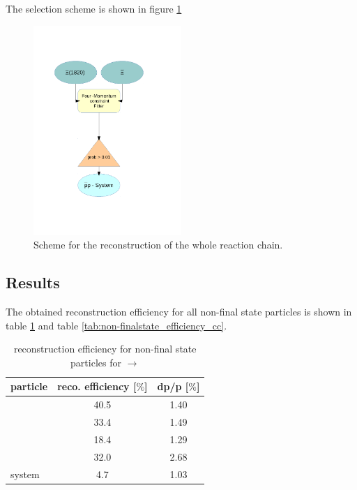 	The selection scheme is shown in figure \ref{fig:fourconstraintfit}
	 
	\begin{figure}
		\centering
			\includegraphics[width=0.50\textwidth]{./plots/combineCascadeSys.pdf}
		\caption{\propose Scheme for the reconstruction of the whole reaction chain.}
		\label{fig:fourconstraintfit}
	\end{figure}
	
	\subsection*{Results}
	
	The obtained reconstruction efficiency for all non-final state particles is shown in table \ref{tab:non-finalstate_efficiency}
	and table \ref{tab:non-finalstate_efficiency_cc}.
	
	\begin{table}
		\centering
		\caption{\propose reconstruction efficiency for non-final state particles for \pbarpSystem $\rightarrow$ \excitedcascade \anticascade}
		\label{tab:non-finalstate_efficiency}
		
		\begin{tabular}{lcc}
		
			\hline
			particle & reco. efficiency [$\%$] & dp/p [$\%$] \\\hline
			\hline
			\lam & 40.5&   1.40 \\
			\alam & 33.4&   1.49\\
			\anticascade & 18.4&   1.29\\
			\excitedcascade & 32.0&   2.68 \\
			\excitedcascade \anticascade system & 4.7&   1.03\\\hline
			 	
		\end{tabular}
	\end{table}
	
